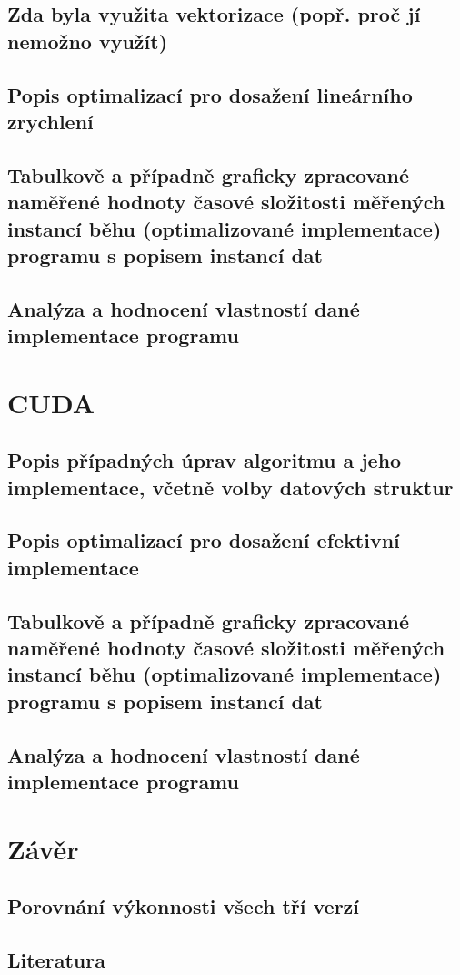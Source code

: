 \documentclass[12pt,a4paper]{article}
\begin{document}
\subsection{Zda byla využita vektorizace (popř. proč jí nemožno využít)}
\subsection{Popis optimalizací pro dosažení lineárního zrychlení}
\subsection{Tabulkově a případně graficky zpracované naměřené hodnoty časové složitosti měřených instancí běhu (optimalizované implementace) programu s popisem instancí dat}
\subsection{Analýza a hodnocení vlastností dané implementace programu}

\section{CUDA}
\subsection{Popis případných úprav algoritmu a jeho implementace, včetně volby datových struktur}
\subsection{Popis optimalizací pro dosažení efektivní implementace}
\subsection{Tabulkově a případně graficky zpracované naměřené hodnoty časové složitosti měřených instancí běhu (optimalizované implementace) programu s popisem instancí dat}
\subsection{Analýza a hodnocení vlastností dané implementace programu}

\section{Závěr}
\subsection{Porovnání výkonnosti všech tří verzí}
\subsection{Literatura}
\end{document}
